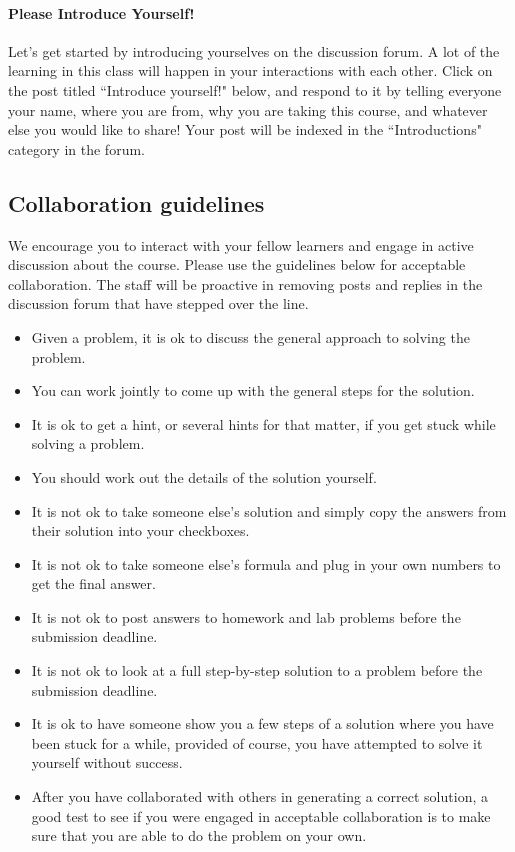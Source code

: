 \documentclass[pdftex, brazil, 12pt, twoside]{article}
\begin{document}
\paragraph{Please Introduce Yourself!} Let's get started by introducing yourselves on the
discussion forum. A lot of the learning in this class will happen in your interactions with
each other. Click on the post titled “Introduce yourself!" below, and respond to it by
telling everyone your name, where you are from, why you are taking this course, and whatever
else you would like to share! Your post will be indexed in the “Introductions"
category in the forum.

\subsection{Collaboration guidelines}
\label{ovw0-collab-guide}

We encourage you to interact with your fellow learners and engage in active discussion
about the course. Please use the guidelines below for acceptable collaboration.
The staff will be proactive in removing posts and replies in the discussion forum
that have stepped over the line.

\begin{itemize}[noitemsep]
\item Given a problem, it is ok to discuss the general approach to solving the problem.
\item You can work jointly to come up with the general steps for the solution.
\item It is ok to get a hint, or several hints for that matter, if you get stuck while
  solving a problem.
\item You should work out the details of the solution yourself.
\item It is not ok to take someone else's solution and simply copy the answers
  from their solution into your checkboxes.
\item It is not ok to take someone else's formula and plug in your own numbers
  to get the final answer.
\item It is not ok to post answers to homework and lab problems before the
  submission deadline.
\item It is not ok to look at a full step-by-step solution to a problem before
  the submission deadline.
\item It is ok to have someone show you a few steps of a solution where you have
  been stuck for a while, provided of course, you have attempted to solve it
  yourself without success.
\item After you have collaborated with others in generating a correct solution,
  a good test to see if you were engaged in acceptable collaboration is to make
  sure that you are able to do the problem on your own. 
\end{itemize}
\end{document}
